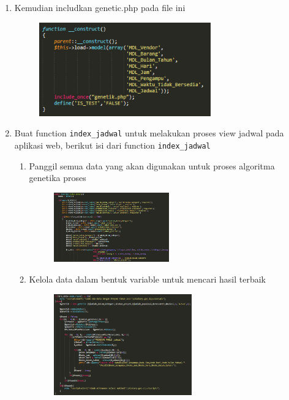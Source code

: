 \begin{enumerate}
    \item Kemudian includkan genetic.php pada file ini
		\begin{figure}[!htbp]
    		\centering
    		\includegraphics[width=0.7\textwidth]{figures/GA8.PNG}
    		\label{GA8}
		\end{figure}
	
	\item Buat function \verb|index_jadwal| untuk melakukan proses view jadwal pada aplikasi web, berikut isi dari function \verb|index_jadwal|
        \begin{enumerate}
            \item Panggil semua data yang akan digunakan untuk proses algoritma genetika proses
        		\begin{figure}[!htbp]
            		\centering
            		\includegraphics[width=0.5\textwidth]{figures/GA9.PNG}
            		\label{GA9}
        		\end{figure}
        	
        	\item Kelola data dalam bentuk variable untuk mencari hasil terbaik
        		\begin{figure}[!htbp]
            		\centering
            		\includegraphics[width=0.6\textwidth]{figures/GA10.PNG}
            		\label{GA10}
        		\end{figure}
        		

\end{enumerate}
\end{enumerate}
